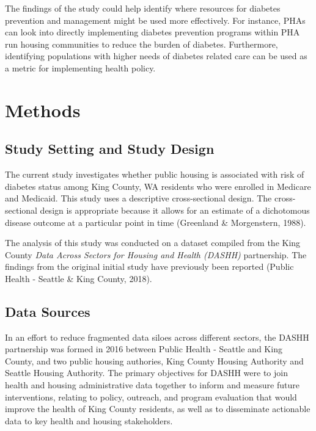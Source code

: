 \documentclass [11pt, proquest] {uwthesis}[2015/03/03]
\begin{document}
The findings of the study could help identify where resources for
diabetes prevention and management might be used more effectively. For
instance, PHAs can look into directly implementing diabetes prevention
programs within PHA run housing communities to reduce the burden of
diabetes. Furthermore, identifying populations with higher needs of
diabetes related care can be used as a metric for implementing health
policy.

\chapter{Methods}\label{methods}

\section{Study Setting and Study
Design}\label{study-setting-and-study-design}

The current study investigates whether public housing is associated with
risk of diabetes status among King County, WA residents who were
enrolled in Medicare and Medicaid. This study uses a descriptive
cross-sectional design. The cross-sectional design is appropriate
because it allows for an estimate of a dichotomous disease outcome at a
particular point in time (Greenland \& Morgenstern, 1988).

The analysis of this study was conducted on a dataset compiled from the
King County \emph{Data Across Sectors for Housing and Health (DASHH)}
partnership. The findings from the original initial study have
previously been reported (Public Health - Seattle \& King County, 2018).

\section{Data Sources}\label{data-sources}

In an effort to reduce fragmented data siloes across different sectors,
the DASHH partnership was formed in 2016 between Public Health - Seattle
and King County, and two public housing authories, King County Housing
Authority and Seattle Housing Authority. The primary objectives for
DASHH were to join health and housing administrative data together to
inform and measure future interventions, relating to policy, outreach,
and program evaluation that would improve the health of King County
residents, as well as to disseminate actionable data to key health and
housing stakeholders.
\end{document}
